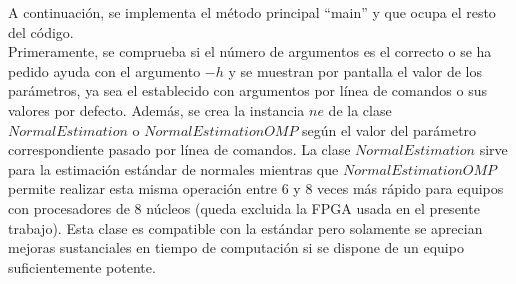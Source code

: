 \iffalse
Se implementa ahora el método que muestra ayuda por pantalla que informa sobre cómo utilizar el programa y los posibles parámetros que acepta.

\begin{lstlisting}[language=C++,breaklines]
void 
printUsage (const char* progName)
{
  std::cout << "\n\nUsage: "<<progName<<" [options] <scene.pcd>\n\n"
            << "Options:\n"
            << "-------------------------------------------\n"
            << "-o <integer>	0 for regular normal estimation (default), 1 for enhanced normal estimation\n"
            << "-r <float>	Radius search for normal estimation (default "<< radius_search<<")\n"
            << "-ms <float>	Minimum scale (default " << min_scale << ")\n"
            << "-no <int>	Number of octaves (default " << n_octaves << ")\n"
            << "-ns <int>	Number of scales per octave (default " << n_scales_per_octave << ")\n"
	    	<< "-mc <float>	Minimum contrast (default " << min_contrast << ")\n"
	    	<< "-h		Show help\n"
            << "\n\n";
}
\end{lstlisting}
\fi

A continuación, se implementa el método principal ``main'' y que ocupa el resto del código.\\
Primeramente, se comprueba si el número de argumentos es el correcto o se ha pedido ayuda con el argumento $-h$ y se muestran por pantalla el valor de los parámetros, ya sea el establecido con argumentos por línea de comandos o sus valores por defecto.
Además, se crea la instancia $ne$ de la clase $NormalEstimation$ o $NormalEstimationOMP$ según el valor del parámetro correspondiente pasado por línea de comandos. La clase $NormalEstimation$ sirve para la estimación estándar de normales mientras que $NormalEstimationOMP$ permite realizar esta misma operación entre 6 y 8 veces más rápido para equipos con procesadores de 8 núcleos (queda excluida la FPGA usada en el presente trabajo). Esta clase es compatible con la estándar pero solamente se aprecian mejoras sustanciales en tiempo de computación si se dispone de un equipo suficientemente potente.


